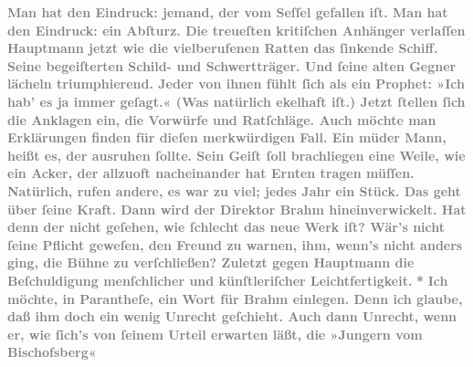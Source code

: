 \begin{ledgroupsized}[t]{13cm}
           \pstart
           \noindent{}\textcolor{gray}{\textbf{Man hat den Eindruck: jemand, der vom Seſſel gefallen iſt. Man
                  hat den Eindruck: ein Abſturz. Die treueſten kritiſchen Anhänger verlaſſen Hauptmann jetzt wie die vielberufenen Ratten
                  das ſinkende Schiff. Seine begeiſterten Schild- und Schwertträger. Und ſeine alten
                  Gegner lächeln triumphierend. Jeder von ihnen fühlt ſich als ein Prophet: »Ich
                  hab’ es ja immer geſagt.« (Was natürlich ekelhaft iſt.) Jetzt ſtellen ſich die
                  Anklagen ein, die Vorwürfe und Ratſchläge. Auch möchte man Erklärungen finden für
                  dieſen merkwürdigen Fall. Ein müder Mann, heißt es, der ausruhen ſollte. Sein
                  Geiſt ſoll brachliegen eine Weile, wie ein Acker, der allzuoft nacheinander hat
                  Ernten tragen müſſen. Natürlich, rufen andere, es war zu viel; jedes Jahr ein
                  Stück. Das geht über ſeine Kraft. Dann wird der Direktor Brahm hineinverwickelt. Hat denn der nicht geſehen, wie
                  ſchlecht das neue Werk iſt?
                  Wär’s nicht ſeine Pflicht geweſen, den Freund zu warnen, ihm, wenn’s nicht anders
                  ging, die Bühne zu verſchließen? Zuletzt gegen Hauptmann die Beſchuldigung
                  menſchlicher und künſtleriſcher Leichtfertigkeit.}}\pend
           \pstart
           \centering{}\textcolor{gray}{\textbf{*}}\pend
           \pstart
           \noindent{}\textcolor{gray}{\textbf{Ich möchte, in Parantheſe, ein Wort für Brahm einlegen. Denn ich glaube, daß ihm doch ein wenig
                  Unrecht geſchieht. Auch dann Unrecht, wenn er, wie ſich’s von ſeinem Urteil
                  erwarten läßt, die »Jungern vom Bischofsberg«
}}
\end{ledgroupsized}
